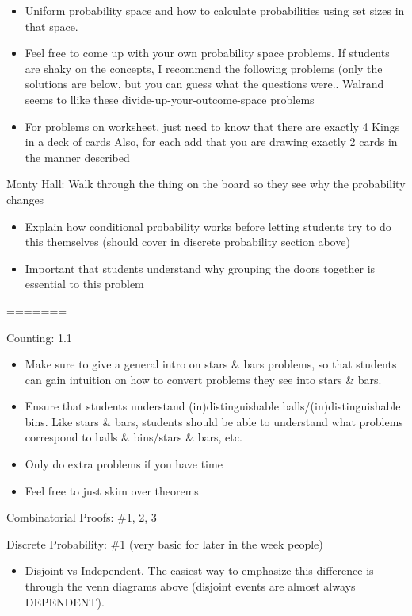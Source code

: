 \documentclass{exam}
\begin{document}
\begin{questions}
\begin{itemize}
\item Uniform probability space and how to calculate probabilities using set sizes in that space.
\item Feel free to come up with your own probability space problems. If students are shaky on the concepts, I recommend the following problems (only the solutions are below, but you can guess what the questions were.. Walrand seems to llike these divide-up-your-outcome-space problems
\item For problems on worksheet, just need to know that there are exactly 4 Kings in a deck of cards
Also, for each add that you are drawing exactly 2 cards in the manner described
\end{itemize}
\item Monty Hall: Walk through the thing on the board so they see why the probability changes
\begin{itemize}
\item Explain how conditional probability works before letting students try to do this themselves (should cover in discrete probability section above)
\item Important that students understand why grouping the doors together is essential to this problem
\end{itemize}
=======
  \item Counting: 1.1
    \begin{itemize}
      \item Make sure to give a general intro on stars \& bars problems, so that students can gain intuition on how to convert problems they see into stars \& bars. 
      \item Ensure that students understand (in)distinguishable balls/(in)distinguishable bins. Like stars \& bars, students should be able to understand what problems correspond to balls \& bins/stars \& bars, etc.
      \item Only do extra problems if you have time
      \item Feel free to just skim over theorems
    \end{itemize}
  \item Combinatorial Proofs: \#1, 2, 3
  \item Discrete Probability: \#1 (very basic for later in the week people)
    \begin{itemize}
      \item Disjoint vs Independent. The easiest way to emphasize this difference is through the venn diagrams above (disjoint events are almost always DEPENDENT).

\end{itemize}
\end{questions}
\end{document}
